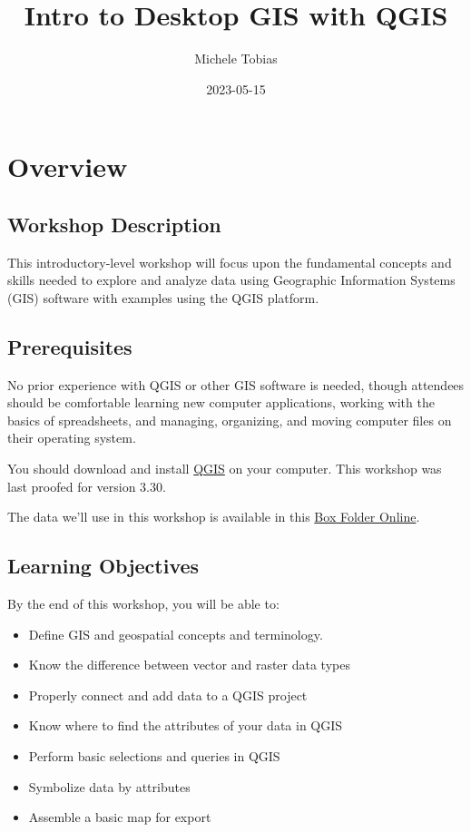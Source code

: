 \documentclass[
]{article}
\title{Intro to Desktop GIS with QGIS}
\author{Michele Tobias}
\date{2023-05-15}
\providecommand{\tightlist}{%
  \setlength{\itemsep}{0pt}\setlength{\parskip}{0pt}}
\begin{document}
\maketitle

{
\setcounter{tocdepth}{2}
\tableofcontents
}
\hypertarget{overview}{%
\section*{Overview}\label{overview}}

\hypertarget{workshop-description}{%
\subsection{Workshop Description}\label{workshop-description}}

This introductory-level workshop will focus upon the fundamental concepts and skills needed to explore and analyze data using Geographic Information Systems (GIS) software with examples using the QGIS platform.

\hypertarget{prerequisites}{%
\subsection{Prerequisites}\label{prerequisites}}

No prior experience with QGIS or other GIS software is needed, though attendees should be comfortable learning new computer applications, working with the basics of spreadsheets, and managing, organizing, and moving computer files on their operating system.

You should download and install \href{https://qgis.org/}{QGIS} on your computer. This workshop was last proofed for version 3.30.

The data we'll use in this workshop is available in this \href{https://ucdavis.box.com/s/cnlz6ejmje4qgf7z80h7ygbwydc65kkm}{Box Folder Online}.

\hypertarget{learning-objectives}{%
\subsection{Learning Objectives}\label{learning-objectives}}

By the end of this workshop, you will be able to:

\begin{itemize}
\tightlist
\item
  Define GIS and geospatial concepts and terminology.
\item
  Know the difference between vector and raster data types
\item
  Properly connect and add data to a QGIS project
\item
  Know where to find the attributes of your data in QGIS
\item
  Perform basic selections and queries in QGIS
\item
  Symbolize data by attributes
\item
  Assemble a basic map for export
\end{itemize}
\end{document}
